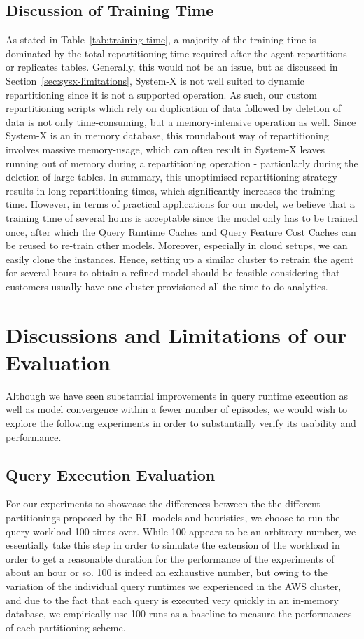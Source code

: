 \subsection{Discussion of Training Time}
\label{sec:discussion-training-time}
As stated in Table~\ref{tab:training-time}, a majority of the training time is dominated by the total repartitioning time required after the agent repartitions or replicates tables. Generally, this would not be an issue, but as discussed in Section~\ref{sec:sysx-limitations}, System-X is not well suited to dynamic repartitioning since it is not a supported operation. As such, our custom repartitioning scripts which rely on duplication of data followed by deletion of data is not only time-consuming, but a memory-intensive operation as well. Since System-X is an in memory database, this roundabout way of repartitioning involves massive memory-usage, which can often result in System-X leaves running out of memory during a repartitioning operation - particularly during the deletion of large tables. In summary, this unoptimised repartitioning strategy results in long repartitioning times, which significantly increases the training time.
However, in terms of practical applications for our model, we believe that a training time of several hours is acceptable since the model only has to be trained once, after which the Query Runtime Caches and Query Feature Cost Caches can be reused to re-train other models. Moreover, especially in cloud setups, we can easily clone the instances. Hence, setting up a similar cluster to retrain the agent for several hours to obtain a refined model should be feasible considering that customers usually have one cluster provisioned all the time to do analytics.

\section{Discussions and Limitations of our Evaluation}
\label{sec:discussion-limitation-evaluation}
Although we have seen substantial improvements in query runtime execution as well as model convergence within a fewer number of episodes, we would wish to explore the following experiments in order to substantially verify its usability and performance.

\subsection{Query Execution Evaluation}
For our experiments to showcase the differences between the the different partitionings proposed by the RL models and heuristics, we choose to run the query workload 100 times over. While 100 appears to be an arbitrary number, we essentially take this step in order to simulate the extension of the workload in order to get a reasonable duration for the performance of the experiments of about an hour or so. 100 is indeed an exhaustive number, but owing to the variation of the individual query runtimes we experienced in the AWS cluster, and due to the fact that each query is executed very quickly in an in-memory database, we empirically use 100 runs as a baseline to measure the performances of each partitioning scheme.

